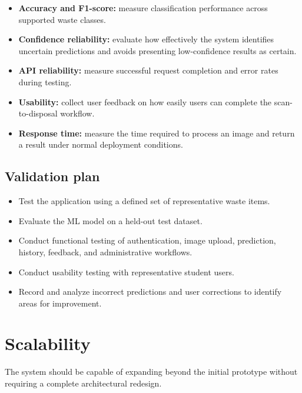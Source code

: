 \documentclass[11pt,a4paper]{article}
\begin{document}
\begin{itemize}[leftmargin=0.7cm]
    \item \textbf{Accuracy and F1-score:} measure classification performance across supported waste classes.
    \item \textbf{Confidence reliability:} evaluate how effectively the system identifies uncertain predictions and avoids presenting low-confidence results as certain.
    \item \textbf{API reliability:} measure successful request completion and error rates during testing.
    \item \textbf{Usability:} collect user feedback on how easily users can complete the scan-to-disposal workflow.
    \item \textbf{Response time:} measure the time required to process an image and return a result under normal deployment conditions.
\end{itemize}

\subsection{Validation plan}

\begin{itemize}[leftmargin=0.7cm]
    \item Test the application using a defined set of representative waste items.
    \item Evaluate the ML model on a held-out test dataset.
    \item Conduct functional testing of authentication, image upload, prediction, history, feedback, and administrative workflows.
    \item Conduct usability testing with representative student users.
    \item Record and analyze incorrect predictions and user corrections to identify areas for improvement.
\end{itemize}

\section{Scalability}

The system should be capable of expanding beyond the initial prototype without requiring a complete architectural redesign.
\end{document}
